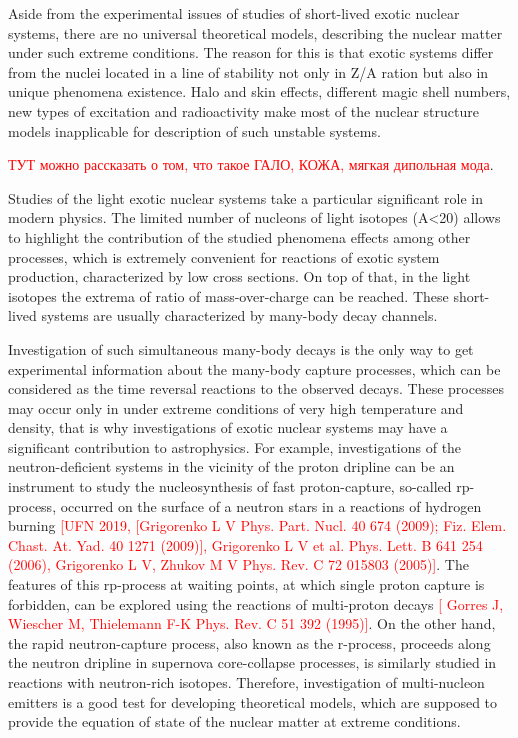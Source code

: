 Aside from the experimental issues of studies of short-lived exotic nuclear systems, there are no universal theoretical models, describing the nuclear matter under such extreme conditions.
The reason for this is that exotic systems differ from the nuclei located in a line of stability not only in Z/A ration but also in unique phenomena existence.
Halo and skin effects, different magic shell numbers, new types of excitation and radioactivity make most of the nuclear structure models inapplicable for description of such unstable systems.

\textcolor{red}{ТУТ можно рассказать о том, что такое ГАЛО, КОЖА, мягкая дипольная мода}.

Studies of the light exotic nuclear systems take a particular significant role in modern physics.
The limited number of nucleons of light isotopes (A<20) allows to highlight the contribution of the studied phenomena effects among other processes, which is extremely convenient for reactions of exotic system production, characterized by low cross sections.
On top of that, in the light isotopes the extrema of ratio of mass-over-charge can be reached.
These short-lived systems are usually characterized by many-body decay channels.

Investigation of such simultaneous many-body decays is the only way to get experimental information about the many-body capture processes, which can be considered as the time reversal reactions to the observed decays.
These processes may occur only in under extreme conditions of very high temperature and density, that is why investigations of exotic nuclear systems may have a significant contribution to astrophysics.
For example, investigations of the neutron-deficient systems in the vicinity of the proton dripline can be an instrument to study the nucleosynthesis of fast proton-capture, so-called rp-process, occurred on the surface of a neutron stars in a reactions of hydrogen burning \textcolor{red}{[UFN 2019, [Grigorenko L V Phys. Part. Nucl. 40 674 (2009); Fiz. Elem. Chast. At. Yad. 40 1271 (2009)],  Grigorenko L V et al. Phys. Lett. B 641 254 (2006),  Grigorenko L V, Zhukov M V Phys. Rev. C 72 015803 (2005)]}. 
The features of this rp-process at waiting points, at which single proton capture is forbidden, can be explored using the reactions of multi-proton decays \textcolor{red}{[ Gorres J, Wiescher M, Thielemann F-K Phys. Rev. C 51 392 (1995)]}.
On the other hand, the rapid neutron-capture process, also known as the r-process, proceeds along the neutron dripline in supernova core-collapse processes, is similarly studied in reactions with neutron-rich isotopes.
Therefore, investigation of multi-nucleon emitters is a good test for developing theoretical models, which are supposed to provide the equation of state of the nuclear matter at extreme conditions. 










